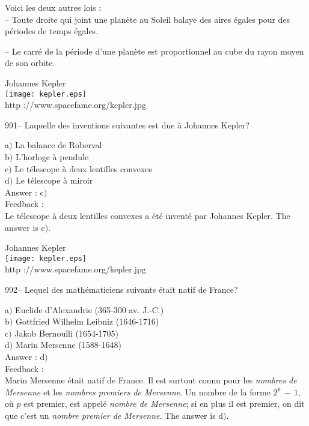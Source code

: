 ﻿\documentclass[letterpaper, 12pt]{article}
\begin{document}
Voici les deux autres lois :\\
-- Toute droite qui joint une plan\`ete au Soleil balaye des aires \'egales
pour des p\'eriodes de temps \'egales.

-- Le carr\'e de la p\'eriode d'une plan\`ete est proportionnel au
cube du rayon moyen de son orbite.
\\

        \begin{center}
        Johannes Kepler\\
    \texttt{[image: kepler.eps]}\\
        {\footnotesize http ://www.spacefame.org/kepler.jpg}
    \end{center}

991-- Laquelle des inventions suivantes est due \`a Johannes Kepler?

a$)$ La balance de Roberval \\
b$)$ L'horloge \`a pendule \\
c$)$ Le t\'elescope \`a deux lentilles convexes \\
d$)$ Le t\'elescope \`a miroir\\

Answer : c$)$\\

Feedback : \\
Le t\'elescope \`a deux lentilles convexes a \'et\'e invent\'e par
Johannes Kepler.
The answer is c$)$.\\

        \begin{center}
        Johannes Kepler\\
    \texttt{[image: kepler.eps]}\\
        {\footnotesize http ://www.spacefame.org/kepler.jpg}
    \end{center}

992-- Lequel des math\'ematiciens suivants \'etait natif de France?

a$)$ Euclide d'Alexandrie (365-300 av. J.-C.) \\
b$)$ Gottfried Wilhelm Leibniz (1646-1716) \\
c$)$ Jakob Bernoulli (1654-1705) \\
d$)$ Marin Mersenne (1588-1648)\\

Answer : d$)$\\

Feedback : \\
Marin Mersenne \'etait natif de France. Il est surtout connu pour
les {\sl nombres de Mersenne} et les {\sl nombres premiers de
Mersenne}. Un nombre de la forme $2^p\,-\,1$, o\`u $p$ est premier,
est appel\'e {\sl nombre de Mersenne}; si en plus il est premier, on
dit que c'est un {\sl nombre premier de Mersenne}.
The answer is d$)$.\\
\end{document}
